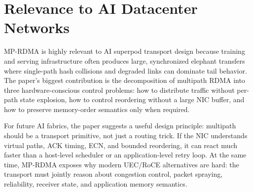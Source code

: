 \documentclass[10.5pt]{article}
\begin{document}
\section{Relevance to AI Datacenter Networks}
MP-RDMA is highly relevant to AI superpod transport design because training and serving infrastructure often produces large, synchronized elephant transfers where single-path hash collisions and degraded links can dominate tail behavior. The paper's biggest contribution is the decomposition of multipath RDMA into three hardware-conscious control problems: how to distribute traffic without per-path state explosion, how to control reordering without a large NIC buffer, and how to preserve memory-order semantics only when required.

For future AI fabrics, the paper suggests a useful design principle: multipath should be a transport primitive, not just a routing trick. If the NIC understands virtual paths, ACK timing, ECN, and bounded reordering, it can react much faster than a host-level scheduler or an application-level retry loop. At the same time, MP-RDMA exposes why modern UEC/RoCE alternatives are hard: the transport must jointly reason about congestion control, packet spraying, reliability, receiver state, and application memory semantics.
\end{document}

